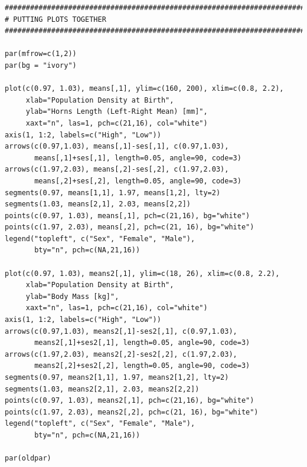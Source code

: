 \documentclass{article}
\begin{document}
\begin{verbatim}
################################################################################
# PUTTING PLOTS TOGETHER
################################################################################

par(mfrow=c(1,2))
par(bg = "ivory")

plot(c(0.97, 1.03), means[,1], ylim=c(160, 200), xlim=c(0.8, 2.2),
     xlab="Population Density at Birth",
     ylab="Horns Length (Left-Right Mean) [mm]",
     xaxt="n", las=1, pch=c(21,16), col="white")
axis(1, 1:2, labels=c("High", "Low"))
arrows(c(0.97,1.03), means[,1]-ses[,1], c(0.97,1.03),
       means[,1]+ses[,1], length=0.05, angle=90, code=3)
arrows(c(1.97,2.03), means[,2]-ses[,2], c(1.97,2.03),
       means[,2]+ses[,2], length=0.05, angle=90, code=3)
segments(0.97, means[1,1], 1.97, means[1,2], lty=2)
segments(1.03, means[2,1], 2.03, means[2,2])
points(c(0.97, 1.03), means[,1], pch=c(21,16), bg="white")
points(c(1.97, 2.03), means[,2], pch=c(21, 16), bg="white")
legend("topleft", c("Sex", "Female", "Male"),
       bty="n", pch=c(NA,21,16))

plot(c(0.97, 1.03), means2[,1], ylim=c(18, 26), xlim=c(0.8, 2.2),
     xlab="Population Density at Birth",
     ylab="Body Mass [kg]",
     xaxt="n", las=1, pch=c(21,16), col="white")
axis(1, 1:2, labels=c("High", "Low"))
arrows(c(0.97,1.03), means2[,1]-ses2[,1], c(0.97,1.03),
       means2[,1]+ses2[,1], length=0.05, angle=90, code=3)
arrows(c(1.97,2.03), means2[,2]-ses2[,2], c(1.97,2.03),
       means2[,2]+ses2[,2], length=0.05, angle=90, code=3)
segments(0.97, means2[1,1], 1.97, means2[1,2], lty=2)
segments(1.03, means2[2,1], 2.03, means2[2,2])
points(c(0.97, 1.03), means2[,1], pch=c(21,16), bg="white")
points(c(1.97, 2.03), means2[,2], pch=c(21, 16), bg="white")
legend("topleft", c("Sex", "Female", "Male"),
       bty="n", pch=c(NA,21,16))

par(oldpar)

\end{verbatim}
\end{document}
